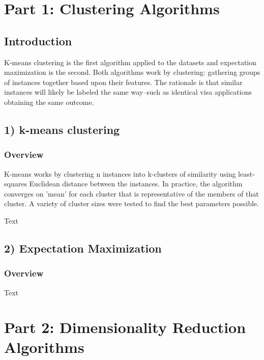 \documentclass[h]{article}
\begin{document}
\section*{Part 1: Clustering Algorithms}
\subsection*{Introduction}  
K-means clustering is the first algorithm applied to the datasets and expectation maximization is the second. 
 Both algorithms work by clustering: gathering groups of instances together 
 based upon their features.  The rationale is that similar instances will likely 
 be labeled the same way--such as identical visa applications obtaining the same 
 outcome.

\subsection*{1) k-means clustering}  
\subsubsection*{Overview}
K-means works by clustering n instances into k-clusters of similarity using least-squares Euclidean distance
 between the instances.  In practice, the algorithm converges on 'mean' for each cluster that is representative of the 
 members of that cluster.   A variety of cluster sizes were tested to find the best parameters 
 possible.
 

Text

\subsection*{2) Expectation Maximization}  
\subsubsection*{Overview}
Text

 
\section*{Part 2: Dimensionality Reduction Algorithms}
\end{document}
